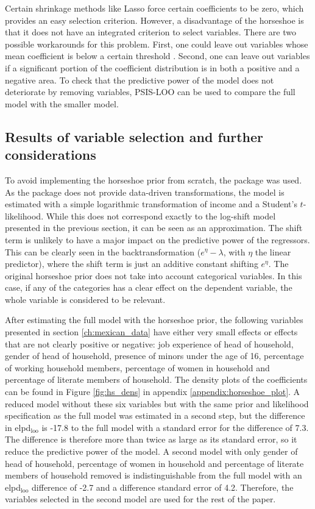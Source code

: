 Certain shrinkage methods like Lasso force certain coefficients to be zero, which provides an easy selection criterion.
However, a disadvantage of the horseshoe is that it does not have an integrated criterion to select variables. There are two possible workarounds for this problem.
First, one could leave out variables whose mean coefficient is below a certain threshold \citep{piironen_sparsity_2017}.
Second, one can leave out variables if a significant portion of the coefficient distribution is in both a positive and a negative area.
To check that the predictive power of the model does not deteriorate by removing variables, PSIS-LOO can be used to compare the full model with the smaller model.

\subsection{Results of variable selection and further considerations}
To avoid implementing the horseshoe prior from scratch, the package  was used.
As the package does not provide data-driven transformations, the model is estimated with a simple logarithmic transformation of income and a Student's $t$-likelihood.
While this does not correspond exactly to the log-shift model presented in the previous section, it can be seen as an approximation.
The shift term is unlikely to have a major impact on the predictive power of the regressors.
This can be clearly seen in the backtransformation ($e^\eta - \lambda$, with $\eta$ the linear predictor), where the shift term is just an additive constant shifting $e^\eta$.
The original horseshoe prior does not take into account categorical variables.
In this case, if any of the categories has a clear effect on the dependent variable, the whole variable is considered to be relevant.

After estimating the full model with the horseshoe prior, the following variables presented in section \ref{ch:mexican_data} have either very small effects or effects that are not clearly positive or negative: job experience of head of household, gender of head of household, presence of minors under the age of 16, percentage of working household members, percentage of women in household and percentage of literate members of household.
The density plots of the coefficients can be found in Figure \ref{fig:hs_dens} in appendix \ref{appendix:horseshoe_plot}.
A reduced model without these six variables but with the same prior and likelihood specification as the full model was estimated in a second step, but the difference in elpd$_{\text{loo}}$ is -17.8 to the full model with a standard error for the difference of 7.3.
The difference is therefore more than twice as large as its standard error, so it reduce the predictive power of the model.
A second model with only gender of head of household, percentage of women in household and percentage of literate members of household removed is indistinguishable from the full model with an elpd$_{\text{loo}}$ difference of -2.7 and a difference standard error of 4.2.
Therefore, the variables selected in the second model are used for the rest of the paper.

